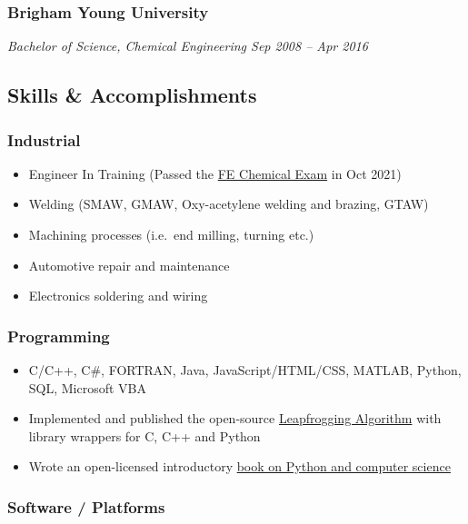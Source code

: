 \subsubsection{Brigham Young
University}\label{brigham-young-university-1}

\emph{Bachelor of Science, Chemical Engineering \textbar{} Sep 2008 --
Apr 2016}

\subsection{Skills \& Accomplishments}\label{skills-accomplishments}

\subsubsection{Industrial}\label{industrial}

\begin{itemize}
\tightlist
\item
  Engineer In Training (Passed the
  \href{https://account.ncees.org/rn/2233456-1459800-66313c5}{FE
  Chemical Exam} in Oct 2021)
\item
  Welding (SMAW, GMAW, Oxy-acetylene welding and brazing, GTAW)
\item
  Machining processes (i.e.~end milling, turning etc.)
\item
  Automotive repair and maintenance
\item
  Electronics soldering and wiring
\end{itemize}

\subsubsection{Programming}\label{programming}

\begin{itemize}
\tightlist
\item
  C/C++, C\#, FORTRAN, Java, JavaScript/HTML/CSS, MATLAB, Python, SQL,
  Microsoft VBA
\item
  Implemented and published the open-source
  \href{https://github.com/flythereddflagg/lpfgopt}{Leapfrogging
  Algorithm} with library wrappers for C, C++ and Python
\item
  Wrote an open-licensed introductory
  \href{https://flythereddflagg.github.io/python_book/site/index.html}{book
  on Python and computer science}
\end{itemize}

\subsubsection{Software / Platforms}\label{software-platforms}

